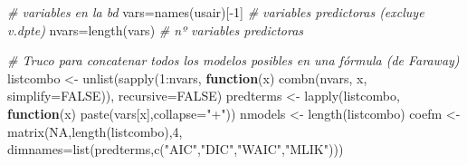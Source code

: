 \documentclass[
]{book}
\newenvironment{Shaded}{\begin{snugshade}}{\end{snugshade}}
\newcommand{\AttributeTok}[1]{\textcolor[rgb]{0.77,0.63,0.00}{#1}}
\newcommand{\CommentTok}[1]{\textcolor[rgb]{0.56,0.35,0.01}{\textit{#1}}}
\newcommand{\ConstantTok}[1]{\textcolor[rgb]{0.00,0.00,0.00}{#1}}
\newcommand{\ControlFlowTok}[1]{\textcolor[rgb]{0.13,0.29,0.53}{\textbf{#1}}}
\newcommand{\DecValTok}[1]{\textcolor[rgb]{0.00,0.00,0.81}{#1}}
\newcommand{\FunctionTok}[1]{\textcolor[rgb]{0.00,0.00,0.00}{#1}}
\newcommand{\NormalTok}[1]{#1}
\newcommand{\OtherTok}[1]{\textcolor[rgb]{0.56,0.35,0.01}{#1}}
\newcommand{\SpecialCharTok}[1]{\textcolor[rgb]{0.00,0.00,0.00}{#1}}
\newcommand{\StringTok}[1]{\textcolor[rgb]{0.31,0.60,0.02}{#1}}
\begin{document}
\begin{Shaded}
\begin{Highlighting}[]
\CommentTok{\# variables en la bd}
\NormalTok{vars}\OtherTok{=}\FunctionTok{names}\NormalTok{(usair)[}\SpecialCharTok{{-}}\DecValTok{1}\NormalTok{] }\CommentTok{\# variables predictoras (excluye v.dpte)}
\NormalTok{nvars}\OtherTok{=}\FunctionTok{length}\NormalTok{(vars) }\CommentTok{\# nº variables predictoras}

\CommentTok{\# Truco para concatenar todos los modelos posibles en una fórmula (de Faraway)}
\NormalTok{listcombo }\OtherTok{\textless{}{-}} \FunctionTok{unlist}\NormalTok{(}\FunctionTok{sapply}\NormalTok{(}\DecValTok{1}\SpecialCharTok{:}\NormalTok{nvars,}
                           \ControlFlowTok{function}\NormalTok{(x) }\FunctionTok{combn}\NormalTok{(nvars, x, }\AttributeTok{simplify=}\ConstantTok{FALSE}\NormalTok{)),}
                    \AttributeTok{recursive=}\ConstantTok{FALSE}\NormalTok{)}
\NormalTok{predterms }\OtherTok{\textless{}{-}} \FunctionTok{lapply}\NormalTok{(listcombo, }
                    \ControlFlowTok{function}\NormalTok{(x) }\FunctionTok{paste}\NormalTok{(vars[x],}\AttributeTok{collapse=}\StringTok{"+"}\NormalTok{))}
\NormalTok{nmodels }\OtherTok{\textless{}{-}} \FunctionTok{length}\NormalTok{(listcombo)}
\NormalTok{coefm }\OtherTok{\textless{}{-}} \FunctionTok{matrix}\NormalTok{(}\ConstantTok{NA}\NormalTok{,}\FunctionTok{length}\NormalTok{(listcombo),}\DecValTok{4}\NormalTok{,}
                \AttributeTok{dimnames=}\FunctionTok{list}\NormalTok{(predterms,}\FunctionTok{c}\NormalTok{(}\StringTok{"AIC"}\NormalTok{,}\StringTok{"DIC"}\NormalTok{,}\StringTok{"WAIC"}\NormalTok{,}\StringTok{"MLIK"}\NormalTok{)))}


\end{Highlighting}
\end{Shaded}
\end{document}
